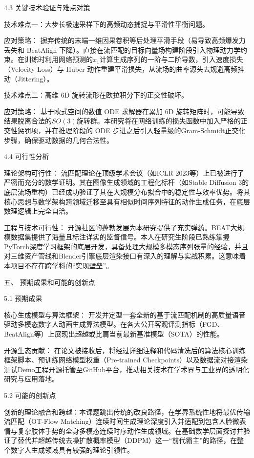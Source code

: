\documentclass[UTF8]{ctexart}
\begin{document}
4.3 关键技术验证与难点对策

技术难点一：大步长极速采样下的高频动态捕捉与平滑性平衡问题。

应对策略：
摒弃传统的末端一维因果卷积等后处理平滑手段（易导致高频爆发力丢失和
BeatAlign
下降）。直接在流匹配的目标向量场构建阶段引入物理动力学约束。在训练时利用网络预测的\({\widehat{x}}_{1}\)计算生成序列的一阶与二阶导数，引入速度损失（Velocity
Loss）与 Huber
动作重建平滑损失，从流场的曲率源头去规避高频抖动（Jittering）。

技术难点二：高维 6D 旋转流形在欧拉积分下的正交性破坏。

应对策略： 基于欧式空间的数值 ODE 求解器在累加 6D
旋转矩阵时，可能导致结果脱离合法的\(SO(3)\)旋转群。本研究将在网络训练的损失函数中加入严格的正交性惩罚项，并在推理阶段的
ODE
步进之后引入轻量级的Gram-Schmidt正交化步骤，确保驱动数据的几何合法性。

4.4 可行性分析

理论架构可行性： 流匹配理论在顶级学术会议（如ICLR
2023等）上已被进行了严密而充分的数学证明。其在图像生成领域的工程化标杆（如Stable
Diffusion
3的底层流场重构）已经成功验证了其在大规模分布拟合中的稳定性与效率优势。将其核心思想与数学架构跨领域迁移至具有相似时间序列特征的动作生成任务，在底层数理逻辑上完全自洽。

工程与技术可行性：
开源社区的蓬勃发展为本研究提供了充实弹药。BEAT大规模数据集提供了海量且标注详实的监督信号。本人在研究生阶段已熟练掌握PyTorch深度学习框架的底层开发，具备处理大规模多模态序列张量的经验，并且对三维资产管线和Blender引擎底层渲染接口有深入的理解与实战积累。这意味着本项目不存在跨学科的``实现壁垒''。

五、 预期成果和可能的创新点

5.1 预期成果

核心生成模型与算法框架：
开发并定型一套全新的基于流匹配机制的高质量语音驱动多模态数字人动画生成算法模型。在各大公开客观评测指标（FGD、BeatAlign等）上展现出超越或比肩当前最新基准模型（SOTA）的性能。

开源生态贡献：
在论文被接收后，将经过详细注释和代码清洗后的算法核心训练框架脚本、预训练网络模型权重（Pre-trained
Checkpoints）以及数据流对接渲染测试Demo工程开源托管至GitHub平台，推动相关技术在学术界与工业界的透明化研究与应用落地。

5.2 可能的创新点

创新的理论融合和跨越：本课题跳出传统的改良路径，在学界系统性地将最优传输流匹配（OT-Flow
Matching）连续时间生成理论深度引入并适配到包含人脸微表情与复杂肢体手势的全身多模态连续时序动作生成领域。在基础数学层面探讨并验证了替代并超越传统去噪扩散概率模型（DDPM）这一``前代霸主''的路径，在整个数字人生成领域具有较强的理论引领性。
\end{document}
